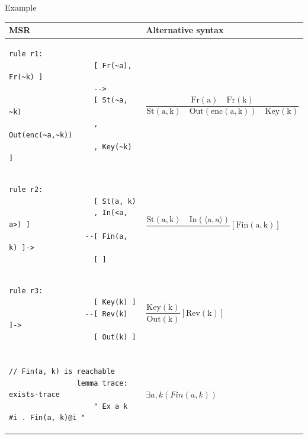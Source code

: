 \documentclass[11pt,aspectratio=169]{beamer}
\begin{document}
\begin{frame}[fragile]{Example}
    \begin{table}[]
        \footnotesize
        \begin{tabular}{ll}
            MSR & Alternative syntax \\
            \toprule
            \begin{lstlisting}[style=tamarin, gobble=16]
                rule r1:
                    [ Fr(~a), Fr(~k) ]
                    -->
                    [ St(~a, ~k)
                    , Out(enc(~a,~k))
                    , Key(~k) ]
            \end{lstlisting} &
            $\mathrm{\dfrac{Fr(a)\quad Fr(k)}{St(a,k)\quad
            Out(enc(a,k))\quad Key(k)}}$ \\
            \midrule
            \begin{lstlisting}[style=tamarin, gobble=16]
                rule r2:
                    [ St(a, k)
                    , In(<a, a>) ]
                  --[ Fin(a, k) ]->
                    [ ]
            \end{lstlisting} &
            $\mathrm{\dfrac{St(a,k)\quad In(\langle a,a \rangle)}{}[Fin(a,k)]}$ 
            \\
            \midrule
            \begin{lstlisting}[style=tamarin, gobble=16]
                rule r3:
                    [ Key(k) ]
                  --[ Rev(k) ]->
                    [ Out(k) ]
            \end{lstlisting} &
            $\mathrm{\dfrac{Key(k)}{Out(k)}[Rev(k)]}$ \\
            \bottomrule \\
            \begin{lstlisting}[style=tamarin, gobble=16]
                // Fin(a, k) is reachable
                lemma trace: exists-trace
                    " Ex a k #i . Fin(a, k)@i "
            \end{lstlisting} &
            $\exists a,k (Fin(a,k))$
        \end{tabular}
    \end{table}
\end{frame}
\end{document}
